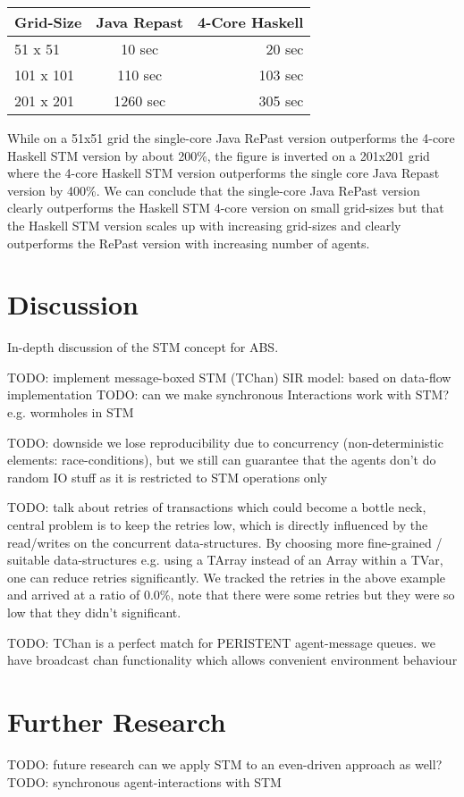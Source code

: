 \begin{center}
  \begin{tabular}{ l || c | r }
    Grid-Size & Java Repast & 4-Core Haskell \\ \hline \hline 
    51 x 51 & 10 sec & 20 sec \\ \hline
    101 x 101 & 110 sec & 103 sec \\ \hline
    201 x 201 & 1260 sec & 305 sec \\ \hline
  \end{tabular}
\end{center}

While on a 51x51 grid the single-core Java RePast version outperforms the 4-core Haskell STM version by about 200\%, the figure is inverted on a 201x201 grid where the 4-core Haskell STM version outperforms the single core Java Repast version by 400\%. We can conclude that the single-core Java RePast version clearly outperforms the Haskell STM 4-core version on small grid-sizes but that the Haskell STM version scales up with increasing grid-sizes and clearly outperforms the RePast version with increasing number of agents.

\section{Discussion}
\label{sect:stm_discussion}
In-depth discussion of the STM concept for ABS.


TODO: implement message-boxed STM (TChan) SIR model: based on data-flow implementation
TODO: can we make synchronous Interactions work with STM? e.g. wormholes in STM

TODO: downside we lose reproducibility due to concurrency (non-deterministic elements: race-conditions), but we still can guarantee that the agents don't do random IO stuff as it is restricted to STM operations only

TODO: talk about retries of transactions which could become a bottle neck, central problem is to keep the retries low, which is directly influenced by the read/writes on the concurrent data-structures. By choosing more fine-grained / suitable data-structures e.g. using a TArray instead of an Array within a TVar, one can reduce retries significantly. We tracked the retries in the above example and arrived at a ratio of 0.0\%, note that there were some retries but they were so low that they didn't significant.

TODO: TChan is a perfect match for PERISTENT agent-message queues. we have broadcast chan functionality which allows convenient environment behaviour

\section{Further Research}
\label{sect:stm_further}
TODO: future research can we apply STM to an even-driven approach as well?
TODO: synchronous agent-interactions with STM